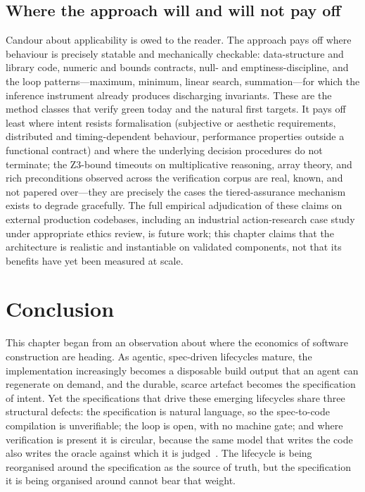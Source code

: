 \subsection{Where the approach will and will not pay off}\label{subsec:a5-payoff}

Candour about applicability is owed to the reader. The approach pays off where behaviour is precisely statable and mechanically checkable: data-structure and library code, numeric and bounds contracts, null- and emptiness-discipline, and the loop patterns---maximum, minimum, linear search, summation---for which the inference instrument already produces discharging invariants. These are the method classes that verify green today and the natural first targets. It pays off least where intent resists formalisation (subjective or aesthetic requirements, distributed and timing-dependent behaviour, performance properties outside a functional contract) and where the underlying decision procedures do not terminate; the Z3-bound timeouts on multiplicative reasoning, array theory, and rich preconditions observed across the verification corpus are real, known, and not papered over---they are precisely the cases the tiered-assurance mechanism exists to degrade gracefully. The full empirical adjudication of these claims on external production codebases, including an industrial action-research case study under appropriate ethics review, is future work; this chapter claims that the architecture is realistic and instantiable on validated components, not that its benefits have yet been measured at scale.

\section{Conclusion}\label{sec:a5-conclusion}

This chapter began from an observation about where the economics of software construction are heading. As agentic, spec-driven lifecycles mature, the implementation increasingly becomes a disposable build output that an agent can regenerate on demand, and the durable, scarce artefact becomes the specification of intent. Yet the specifications that drive these emerging lifecycles share three structural defects: the specification is natural language, so the spec-to-code compilation is unverifiable; the loop is open, with no machine gate; and where verification is present it is circular, because the same model that writes the code also writes the oracle against which it is judged~\cite{liu2023evalplus,liu2026oracle}. The lifecycle is being reorganised around the specification as the source of truth, but the specification it is being organised around cannot bear that weight.

